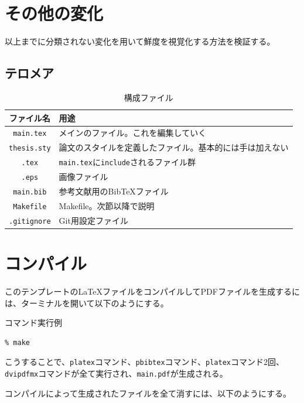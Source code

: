 \section{その他の変化}

以上までに分類されない変化を用いて鮮度を視覚化する方法を検証する。

\subsection{テロメア}


\begin{table}[htbp]
  \caption{構成ファイル}
  \label{tb:files}
  \begin{center}\begin{tabular}{c|l}
    \hline
    ファイル名&用途\\\hline\hline
    {\tt main.tex}&メインのファイル。これを編集していく\\\hline
    {\tt thesis.sty}&論文のスタイルを定義したファイル。基本的には手は加えない\\\hline
    {\tt *.tex}&{\tt main.tex}に{\tt include}されるファイル群\\\hline
    {\tt *.eps}&画像ファイル\\\hline
    {\tt main.bib}&参考文献用のBibTeXファイル\\\hline
    {\tt Makefile}&Makefile。次節以降で説明\\\hline
    {\tt .gitignore}&Git用設定ファイル\\\hline
  \end{tabular}\end{center}
\end{table}

\section{コンパイル}
このテンプレートの\LaTeX ファイルをコンパイルしてPDFファイルを生成するには、ターミナルを開いて以下のようにする。

\begin{itembox}[l]{コマンド実行例}
\begin{verbatim}
% make
\end{verbatim}
\end{itembox}

こうすることで、\verb|platex|コマンド、\verb|pbibtex|コマンド、\verb|platex|コマンド2回、\verb|dvipdfmx|コマンドが全て実行され、{\tt main.pdf}が生成される。

コンパイルによって生成されたファイルを全て消すには、以下のようにする。

